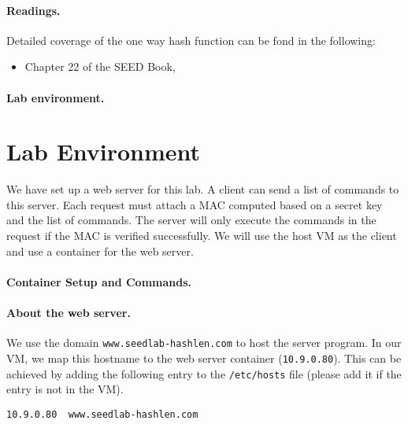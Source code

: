 \paragraph{Readings.} Detailed coverage of the one way hash function can be
fond in the following:

\begin{itemize}
\item Chapter 22 of the SEED Book, \seedbook
\end{itemize}


\paragraph{Lab environment.}
\seedenvironmentB
\nodependency




\section{Lab Environment}

We have set up a web server for this lab.
A client can send a list of commands to this server.
Each request must attach a MAC computed based on a secret
key and the list of commands. The server will
only execute the commands in the request if
the MAC is verified successfully.
We will use the host VM as the client and use
a container for the web server.


\paragraph{Container Setup and Commands.}




\paragraph{About the web server.}
We use the domain \texttt{www.seedlab-hashlen.com} to host the server program.
In our VM, we map this hostname to
the web server container (\texttt{10.9.0.80}). This can be
achieved by adding the following entry to the
\texttt{/etc/hosts} file (please add it if the entry is not
in the VM).

\begin{lstlisting}
10.9.0.80  www.seedlab-hashlen.com
\end{lstlisting}


